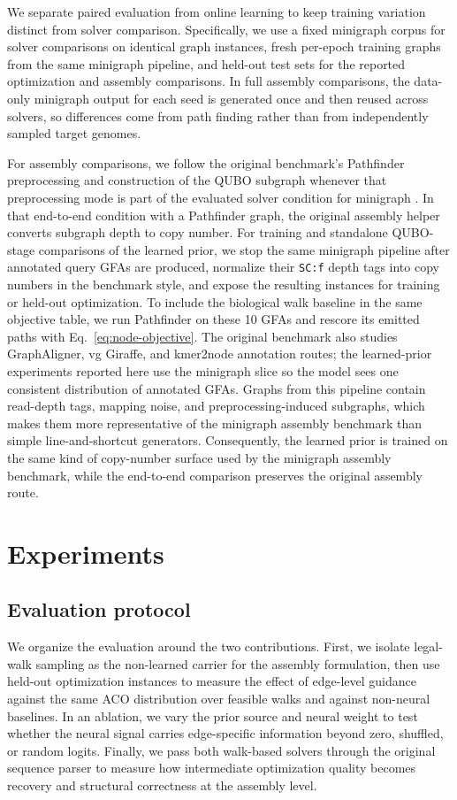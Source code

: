 \documentclass[11pt]{article}
\begin{document}
We separate paired evaluation from online learning to keep training variation distinct from solver comparison. Specifically, we use a fixed minigraph corpus for solver comparisons on identical graph instances, fresh per-epoch training graphs from the same minigraph pipeline, and held-out test sets for the reported optimization and assembly comparisons. In full assembly comparisons, the data-only minigraph output for each seed is generated once and then reused across solvers, so differences come from path finding rather than from independently sampled target genomes.

For assembly comparisons, we follow the original benchmark's Pathfinder preprocessing and construction of the QUBO subgraph whenever that preprocessing mode is part of the evaluated solver condition for minigraph \citep{cudby2026pangenome}. In that end-to-end condition with a Pathfinder graph, the original assembly helper converts subgraph depth to copy number. For training and standalone QUBO-stage comparisons of the learned prior, we stop the same minigraph pipeline after annotated query GFAs are produced, normalize their \texttt{SC:f} depth tags into copy numbers in the benchmark style, and expose the resulting instances for training or held-out optimization. To include the biological walk baseline in the same objective table, we run Pathfinder on these 10 GFAs and rescore its emitted paths with Eq.~\ref{eq:node-objective}. The original benchmark also studies GraphAligner, vg Giraffe, and kmer2node annotation routes; the learned-prior experiments reported here use the minigraph slice so the model sees one consistent distribution of annotated GFAs. Graphs from this pipeline contain read-depth tags, mapping noise, and preprocessing-induced subgraphs, which makes them more representative of the minigraph assembly benchmark than simple line-and-shortcut generators. Consequently, the learned prior is trained on the same kind of copy-number surface used by the minigraph assembly benchmark, while the end-to-end comparison preserves the original assembly route.

\section{Experiments}

\subsection{Evaluation protocol}

We organize the evaluation around the two contributions. First, we isolate legal-walk sampling as the non-learned carrier for the assembly formulation, then use held-out optimization instances to measure the effect of edge-level guidance against the same ACO distribution over feasible walks and against non-neural baselines. In an ablation, we vary the prior source and neural weight to test whether the neural signal carries edge-specific information beyond zero, shuffled, or random logits. Finally, we pass both walk-based solvers through the original sequence parser to measure how intermediate optimization quality becomes recovery and structural correctness at the assembly level.
\end{document}
